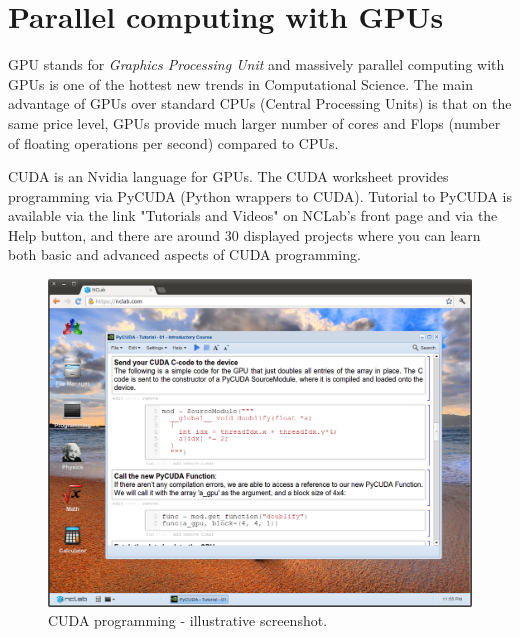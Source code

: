 \documentclass{article}
\begin{document}
\section{Parallel computing with GPUs}

GPU stands for {\em Graphics Processing Unit} and massively parallel computing with GPUs
is one of the hottest new trends in Computational Science. The main advantage 
of GPUs over standard CPUs (Central Processing Units) is that on the same price 
level, GPUs provide much larger number of cores and Flops (number of floating 
operations per second) compared to CPUs.
 
CUDA is an Nvidia language for GPUs. The CUDA worksheet provides programming via 
PyCUDA (Python wrappers to CUDA). Tutorial to PyCUDA is available via the link "Tutorials and Videos" 
on NCLab's front page and via the Help button, and there are around 30 
displayed projects where you can learn both basic and advanced aspects of CUDA
programming. 

\begin{figure}[!ht]
\begin{center}
\includegraphics[width=\textwidth]{img/progr4.png}
\end{center}
\caption{CUDA programming - illustrative screenshot.}
\label{fig:progr4}
\end{figure}
\noindent
\end{document}
